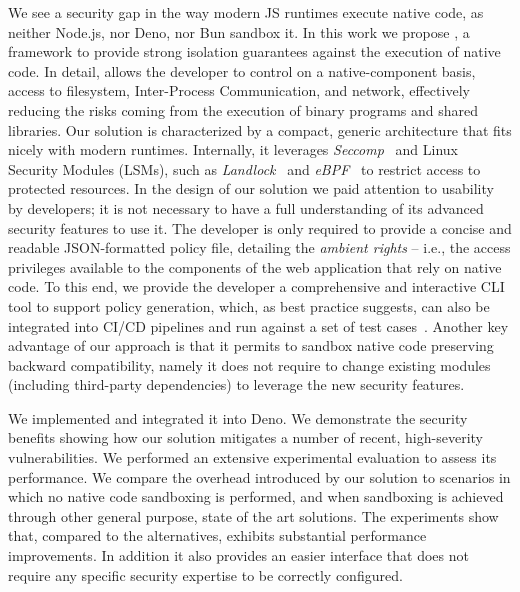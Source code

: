 We see a security gap in the way modern JS runtimes execute native
code, as neither Node.js, nor Deno, nor Bun sandbox it.  In this work
we propose \natisand, a framework to provide strong isolation guarantees
against the execution of native code. In detail, \natisand allows the
developer to control on a native-component basis, access to filesystem, Inter-Process
Communication, and network, effectively reducing the risks coming from
the execution of binary programs and shared libraries. Our solution is
characterized by a compact, generic architecture that fits nicely with
modern runtimes. Internally, it leverages {\em
  Seccomp}~\cite{seccompbpf} and Linux Security Modules (LSMs), such
as {\em Landlock}~\cite{landlock} and {\em eBPF}~\cite{corbet2014eBPF}
to restrict access to protected resources. In the design of our
solution we paid attention to usability by developers; it is not
necessary to have a full understanding of its advanced security
features to use it.  The developer is only required to provide a
concise and readable JSON-formatted policy file, detailing the {\em
  ambient rights} -- i.e., the access privileges available to the
components of the web application that rely on native code. To this
end, we provide the developer a comprehensive and interactive CLI tool
to support policy generation, which, as best practice
suggests, can also be integrated into CI/CD pipelines and run against
a set of test cases~\cite{sandtrap,slimtoolkit}. Another key advantage
of our approach is that it permits to sandbox native code preserving
backward compatibility, namely it does not require to change existing
modules (including third-party dependencies) to leverage the new
security features.

We implemented \natisand and integrated it into Deno. We demonstrate the
security benefits showing how our solution mitigates a number of
recent, high-severity vulnerabilities. We performed an extensive
experimental evaluation to assess its performance. We compare the
overhead introduced by our solution to scenarios in which no native
code sandboxing is performed, and when sandboxing is achieved through
other general purpose, state of the art solutions. The experiments
show that, compared to the alternatives, \natisand exhibits substantial
performance improvements. In addition it also provides an easier
interface that does not require any specific security expertise to be
correctly configured.


